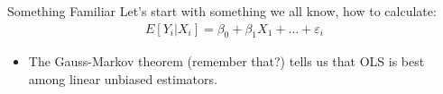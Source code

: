 \documentclass[11pt,handout,xcolor=pdftex,dvipsnames,table,mathserif,aspectratio=169]{beamer}
\begin{document}
\begin{frame}{Something Familiar}
Let's start with something we all know, how to calculate:
\begin{eqnarray*}
E[Y_i | X_i ] = \beta_0 + \beta_1 X_1 + \ldots + \varepsilon_i
\end{eqnarray*}
\begin{itemize}
\item The Gauss-Markov theorem (remember that?) tells us that OLS is best among linear unbiased estimators.
\end{itemize}
\end{frame}
%
%
%
\end{document}
